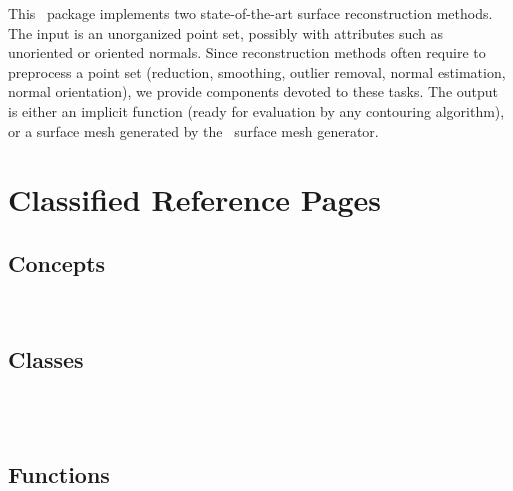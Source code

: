 


This \cgal\ package implements two state-of-the-art surface reconstruction methods.
The input is an unorganized point set, possibly with attributes such as unoriented or oriented normals.
Since reconstruction methods often require to preprocess a point set (reduction, smoothing,
outlier removal, normal estimation, normal orientation), we provide components devoted to these tasks.
The output is either an implicit function (ready for evaluation by any contouring algorithm),
or a surface mesh generated by the \cgal\ surface mesh generator.

\section{Classified Reference Pages}


\subsection{Concepts}

  \\


\subsection{Classes}

  \\
  \\


\subsection{Functions}

  \\
  \\
  \\
  \\

